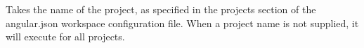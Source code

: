 Takes the name of the project, as specified in the {\ttfamily projects} section of the {\ttfamily angular.\+json} workspace configuration file. When a project name is not supplied, it will execute for all projects. 